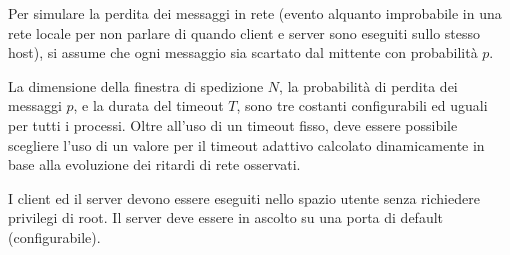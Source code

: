\documentclass[12pt]{article}
\begin{document}
{Per simulare la perdita dei messaggi in rete (evento alquanto improbabile in
una rete locale per non parlare di quando client e server sono eseguiti sullo
stesso host), si assume che ogni messaggio sia scartato dal mittente con
probabilità $p$.

La dimensione della finestra di spedizione $N$, la probabilità di perdita dei
messaggi $p$, e la durata del timeout $T$, sono tre costanti configurabili
ed uguali per tutti i processi. Oltre all'uso di un timeout fisso, deve essere
possibile scegliere l'uso di un valore per il timeout adattivo calcolato
dinamicamente in base alla evoluzione dei ritardi di rete osservati.

I client ed il server devono essere eseguiti nello spazio utente senza
richiedere privilegi di root. Il server deve essere in ascolto su una porta
di default (configurabile).

}
\end{document}
